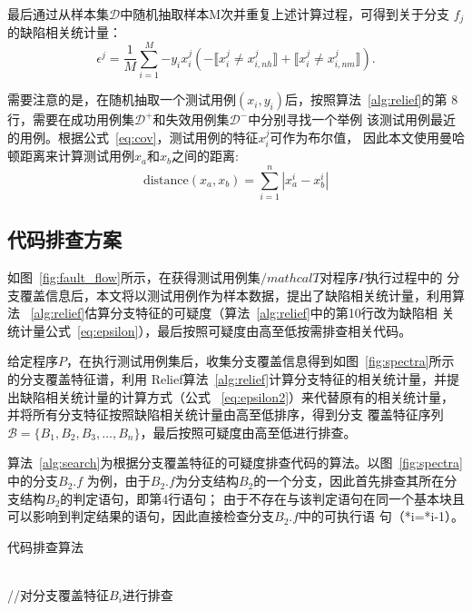 最后通过从样本集$\mathcal D$中随机抽取样本M次并重复上述计算过程，可得到关于分支
$f_j$的缺陷相关统计量：
\begin{equation}
       \epsilon^j = \frac{1}{M}\sum_{i=1}^M{ -y_ix_i^j(-\llbracket x_i^j \neq x_{i,nh}^j \rrbracket + \llbracket x_i^j \neq x_{i,nm}^j \rrbracket)}. \label{eq:epsilon2}
\end{equation}

需要注意的是，在随机抽取一个测试用例$(x_i,y_i)$后，按照算法~\ref{alg:relief}的第
8行，需要在成功用例集$\mathcal D^+$和失效用例集$\mathcal D^-$中分别寻找一个举例
该测试用例最近的用例。根据公式~\ref{eq:cov}，测试用例的特征$x_i^j$可作为布尔值，
因此本文使用曼哈顿距离来计算测试用例$x_a$和$x_b$之间的距离:
\begin{equation}
      \text{distance}(x_a,x_b) = \sum_{i=1}^n{|x_a^i-x_b^i|}
\end{equation}

\subsection{代码排查方案}\label{code_search}
如图~\ref{fig:fault_flow}所示，在获得测试用例集$/mathcal T$对程序$P$执行过程中的
分支覆盖信息后，本文将以测试用例作为样本数据，提出了缺陷相关统计量，利用算法
~\ref{alg:relief}估算分支特征的可疑度（算法~\ref{alg:relief}中的第10行改为缺陷相
关统计量公式~\ref{eq:epsilon}），最后按照可疑度由高至低按需排查相关代码。

给定程序$P$，在执行测试用例集后，收集分支覆盖信息得到如图~\ref{fig:spectra}所示的分支覆盖特征谱，利用
Relief算法~\ref{alg:relief}计算分支特征的相关统计量，并提出缺陷相关统计量的计算方式（公式
~\ref{eq:epsilon2}）来代替原有的相关统计量，并将所有分支特征按照缺陷相关统计量由高至低排序，得到分支
覆盖特征序列$\mathcal B=\{B_1,B_2,B_3,...,B_n\}$，最后按照可疑度由高至低进行排查。

算法~\ref{alg:search}为根据分支覆盖特征的可疑度排查代码的算法。以图~\ref{fig:spectra}中的分支$B_2.f$
为例，由于$B_2.f$为分支结构$B_2$的一个分支，因此首先排查其所在分支结构$B_2$的判定语句，即第4行语句；
由于不存在与该判定语句在同一个基本块且可以影响到判定结果的语句，因此直接检查分支$B_2.f$中的可执行语
句（*i=*i-1）。

\begin{algorithm}[H]
\caption{代码排查算法}\label{alg:search}
\\
 {
      //对分支覆盖特征$B_i$进行排查 \\
}
\end{algorithm}

